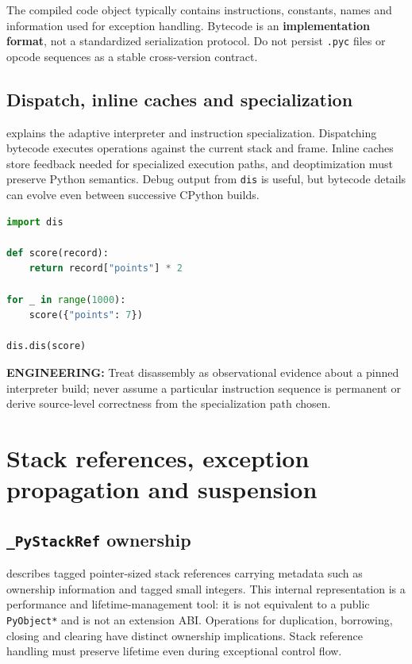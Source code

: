 \documentclass[
  11pt,
]{report}
\newcommand{\passthrough}[1]{#1}
\begin{document}
The compiled code object typically contains instructions, constants,
names and information used for exception handling. Bytecode is an
\textbf{implementation format}, not a standardized serialization
protocol. Do not persist \passthrough{\lstinline!.pyc!} files or opcode
sequences as a stable cross-version contract.

\section{Dispatch, inline caches and
specialization}\label{dispatch-inline-caches-and-specialization}

 explains the
adaptive interpreter and instruction specialization. Dispatching
bytecode executes operations against the current stack and frame. Inline
caches store feedback needed for specialized execution paths, and
deoptimization must preserve Python semantics. Debug output from
\passthrough{\lstinline!dis!} is useful, but bytecode details can evolve
even between successive CPython builds.

\begin{lstlisting}[language=Python]
import dis

def score(record):
    return record["points"] * 2

for _ in range(1000):
    score({"points": 7})

dis.dis(score)
\end{lstlisting}

\textbf{ENGINEERING:} Treat disassembly as observational evidence about
a pinned interpreter build; never assume a particular instruction
sequence is permanent or derive source-level correctness from the
specialization path chosen.

\chapter{Stack references, exception propagation and
suspension}\label{stack-references-exception-propagation-and-suspension}

\section{\texorpdfstring{\texttt{\_PyStackRef}
ownership}{\_PyStackRef ownership}}\label{pystackref-ownership}

 describes tagged
pointer-sized stack references carrying metadata such as ownership
information and tagged small integers. This internal representation is a
performance and lifetime-management tool: it is not equivalent to a
public \passthrough{\lstinline!PyObject*!} and is not an extension ABI.
Operations for duplication, borrowing, closing and clearing have
distinct ownership implications. Stack reference handling must preserve
lifetime even during exceptional control flow.
\end{document}
